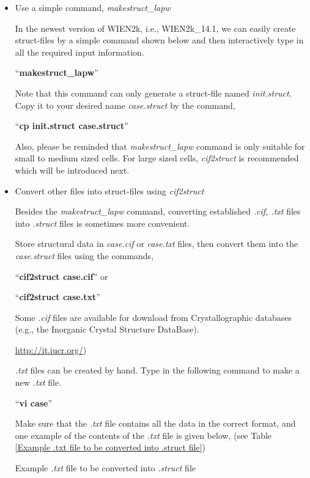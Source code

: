 \documentclass[12 pt]{article}
\begin{document}
  \begin{itemize}[leftmargin=0.2in]
    
    \item Use a simple command, \emph{makestruct\_lapw}

  In the newest version of WIEN2k, i.e., WIEN2k\_14.1, we can easily create struct-files by a simple command shown 
below and then interactively type in all the required input information.

  ``\textbf{makestruct\_lapw}''

  Note that this command can only generate a struct-file named \emph{init.struct}. Copy it to your desired name
 \emph{case.struct} by the command, 

  ``\textbf{cp init.struct case.struct}''

  Also, please be reminded that \emph{makestruct\_lapw} command is only suitable for small to medium sized 
cells. For large sized cells, \emph{cif2struct} is recommended which will be introduced next.

  \cleardoublepage

    \item Convert other files into struct-files using \emph{cif2struct}

  Besides the \emph{makestruct\_lapw} command, converting established \emph{.cif, .txt} files into \emph{.struct} 
files is sometimes more convenient. 

  Store structural data in \emph{case.cif} or \emph{case.txt} files, then convert them into the
 \emph{case.struct} files using the commands,

  ``\textbf{cif2struct case.cif}'' or 

  ``\textbf{cif2struct case.txt}''

  Some \emph{.cif} files are available for download from Crystallographic databases (e.g., the Inorganic Crystal 
Structure DataBase).

  \url{http://it.iucr.org/}) 

  \emph{.txt} files can be created by hand. Type in the following command to make a new \emph{.txt} file.

  ``\textbf{vi case}''

  Make sure that the \emph{.txt} file contains all the data in the correct format, and one example of the contents of
 the \emph{.txt} file is given below, (see Table \ref{Example .txt file to be converted into .struct file})

  \begin{table}[ht]
    \centering
    \caption{Example \emph{.txt} file to be converted into \emph{.struct} file}
    \label{Example .txt file to be converted into .struct file}
    \vspace{2ex}


\end{table}
\end{itemize}
\end{document}
